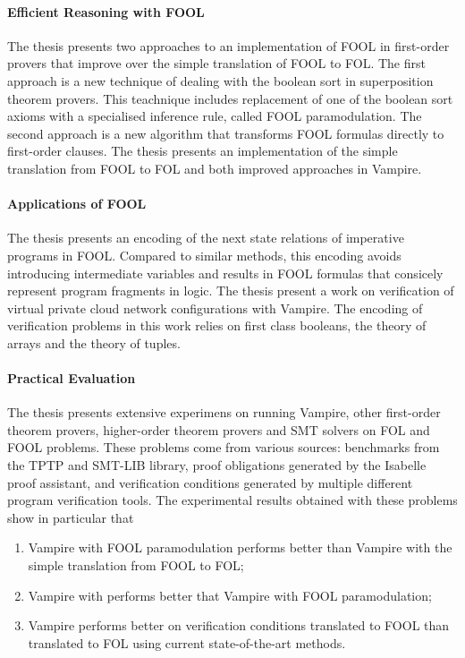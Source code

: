 \paragraph{Efficient Reasoning with FOOL}
The thesis presents two approaches to an implementation of FOOL in first-order provers that improve over the simple translation of FOOL to FOL. The first approach is a new technique of dealing with the boolean sort in superposition theorem provers. This teachnique includes replacement of one of the boolean sort axioms with a specialised inference rule, called FOOL paramodulation. The second approach is a new algorithm \nfcnf{} that transforms FOOL formulas directly to first-order clauses. The thesis presents an implementation of the simple translation from FOOL to FOL and both improved approaches in Vampire.

\paragraph{Applications of FOOL}
The thesis presents an encoding of the next state relations of imperative programs in FOOL. Compared to similar methods, this encoding avoids introducing intermediate variables and results in FOOL formulas that consicely represent program fragments in logic.
The thesis present a work on verification of virtual private cloud network configurations with Vampire. The encoding of verification problems in this work relies on first class booleans, the theory of arrays and the theory of tuples.

\paragraph{Practical Evaluation}
The thesis presents extensive experimens on running Vampire, other first-order theorem provers, higher-order theorem provers and SMT solvers on FOL and FOOL problems. These problems come from various sources: benchmarks from the TPTP and SMT-LIB library, proof obligations generated by the Isabelle proof assistant, and verification conditions generated by multiple different program verification tools. The experimental results obtained with these problems show in particular that \begin{enumerate}
  \item Vampire with FOOL paramodulation performs better than Vampire with the simple translation from FOOL to FOL;
  \item Vampire with \nfcnf{} performs better that Vampire with FOOL paramodulation;
  \item Vampire performs better on verification conditions translated to FOOL than translated to FOL using current state-of-the-art methods.
\end{enumerate}

